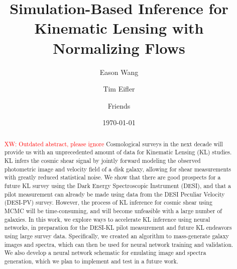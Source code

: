 \documentclass[reprint,superscriptaddress,showframe,nofootinbib,aps,prd,longbibliography,noeprint]{revtex4-2}
\newcommand{\XW}[1]{{\textcolor{red}{XW: #1}}}
\begin{document}
\preprint{}

\title{Simulation-Based Inference for Kinematic Lensing with Normalizing Flows}%

\author{Eason Wang}

\author{Tim Eifler}

\author{Friends}


\date{\today}%

\begin{abstract}
\XW{Outdated abstract, please ignore} Cosmological surveys in the next decade will provide us with an unprecedented amount of data for Kinematic Lensing (KL) studies. KL infers the cosmic shear signal by jointly forward modeling the observed photometric image and velocity field of a disk galaxy, allowing for shear measurements with greatly reduced statistical noise. We show that there are good prospects for a future KL survey using the Dark Energy Spectroscopic Instrument (DESI), and that a pilot measurement can already be made using data from the DESI Peculiar Velocity (DESI-PV) survey. However, the process of KL inference for cosmic shear using MCMC will be time-consuming, and will become unfeasible with a large number of galaxies. In this work, we explore ways to accelerate KL inference using neural networks, in preparation for the DESI-KL pilot measurement and future KL endeavors using large survey data. Specifically, we created an algorithm to mass-generate galaxy images and spectra, which can then be used for neural network training and validation. We also develop a neural network schematic for emulating image and spectra generation, which we plan to implement and test in a future work.

\end{abstract}

\maketitle
\end{document}
